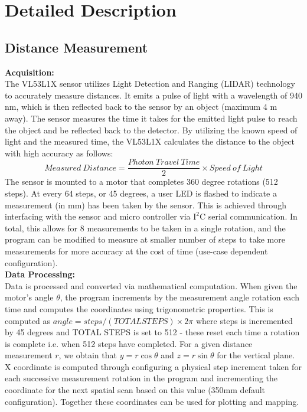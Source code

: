 \documentclass[12pt, letterpaper]{article}
\begin{document}
\section{Detailed Description}
\subsection{Distance Measurement}
\textbf{Acquisition:}\\
The VL53L1X sensor utilizes Light Detection and Ranging (LIDAR) technology to accurately measure distances. It emits a pulse of light with a wavelength of 940 nm, which is then reflected back to the sensor by an object (maximum 4 m away). The sensor measures the time it takes for the emitted light pulse to reach the object and be reflected back to the detector. By utilizing the known speed of light and the measured time, the VL53L1X calculates the distance to the object with high accuracy as follows:
$$Measured\ Distance = \frac{Photon\ Travel\ Time}{2}\times Speed\ of\ Light$$ The sensor is mounted to a motor that completes 360 degree rotations (512 steps). At every 64 steps, or 45 degrees, a user LED is flashed to indicate a measurement (in mm) has been taken by the sensor. This is achieved through interfacing with the sensor and micro controller via $\mathrm{I^2C}$ serial communication. In total, this allows for 8 measurements to be taken in a single rotation, and the program can be modified to measure at smaller number of steps to take more measurements for more accuracy at the cost of time (use-case dependent configuration). \\ 
\textbf{Data Processing:} \\
Data is processed and converted via mathematical computation. When given the motor's angle $\theta$, the program increments by the measurement angle rotation each time and computes the coordinates using trigonometric properties. This is computed as $angle = steps/(TOTAL STEPS) \times 2\pi$ where steps is incremented by 45 degrees and TOTAL STEPS is set to 512 - these reset each time a rotation is complete i.e. when 512 steps have completed. For a given distance measurement $r$, we obtain that $y = r\cos{\theta}$ and $z = r\sin{\theta}$ for the vertical plane. X coordinate is computed through configuring a physical step increment taken for each successive measurement rotation in the program and incrementing the coordinate for the next spatial scan based on this value (350mm default configuration). Together these coordinates can be used for plotting and mapping. 
\end{document}
